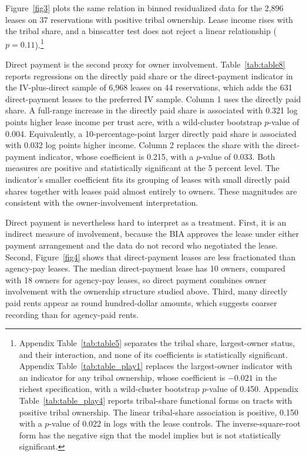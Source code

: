 \documentclass[12pt]{article}
\begin{document}
Figure~\ref{fig3} plots the same relation in binned residualized data for the 2,896 leases on 37 reservations with positive tribal ownership. Lease income rises with the tribal share, and a binscatter test does not reject a linear relationship ($p=0.11$).\footnote{Appendix Table~\ref{tab:table5} separates the tribal share, largest-owner status, and their interaction, and none of its coefficients is statistically significant. Appendix Table~\ref{tab:table_play1} replaces the largest-owner indicator with an indicator for any tribal ownership, whose coefficient is $-0.021$ in the richest specification, with a wild-cluster bootstrap $p$-value of 0.450. Appendix Table~\ref{tab:table_play4} reports tribal-share functional forms on tracts with positive tribal ownership. The linear tribal-share association is positive, 0.150 with a $p$-value of 0.022 in logs with the lease controls. The inverse-square-root form has the negative sign that the model implies but is not statistically significant.}

Direct payment is the second proxy for owner involvement. Table~\ref{tab:table8} reports regressions on the directly paid share or the direct-payment indicator in the IV-plus-direct sample of 6,968 leases on 44 reservations, which adds the 631 direct-payment leases to the preferred IV sample. Column 1 uses the directly paid share. A full-range increase in the directly paid share is associated with 0.321 log points higher lease income per trust acre, with a wild-cluster bootstrap $p$-value of 0.004. Equivalently, a 10-percentage-point larger directly paid share is associated with 0.032 log points higher income. Column 2 replaces the share with the direct-payment indicator, whose coefficient is 0.215, with a $p$-value of 0.033. Both measures are positive and statistically significant at the 5 percent level. The indicator's smaller coefficient fits its grouping of leases with small directly paid shares together with leases paid almost entirely to owners. These magnitudes are consistent with the owner-involvement interpretation.

Direct payment is nevertheless hard to interpret as a treatment. First, it is an indirect measure of involvement, because the BIA approves the lease under either payment arrangement and the data do not record who negotiated the lease. Second, Figure~\ref{fig4} shows that direct-payment leases are less fractionated than agency-pay leases. The median direct-payment lease has 10 owners, compared with 18 owners for agency-pay leases, so direct payment combines owner involvement with the ownership structure studied above. Third, many directly paid rents appear as round hundred-dollar amounts, which suggests coarser recording than for agency-paid rents.
\end{document}
